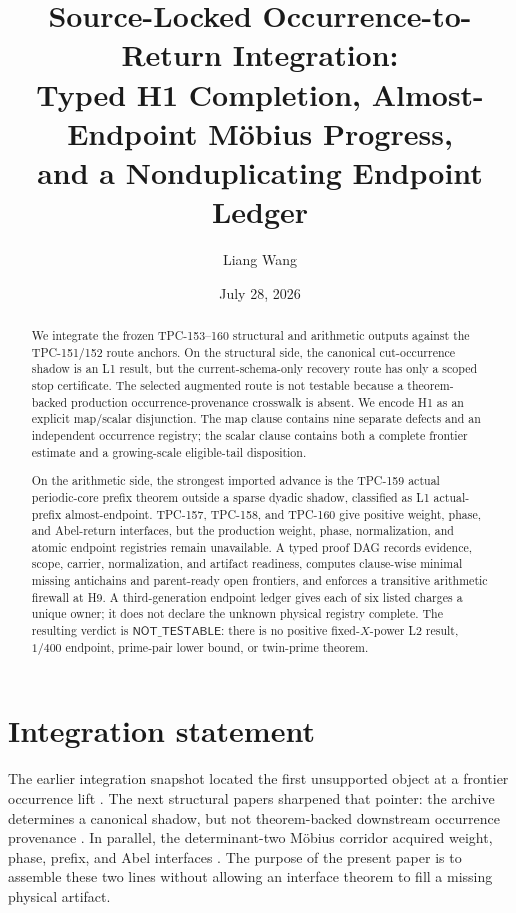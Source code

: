\documentclass[11pt]{article}
\title{\textbf{Source-Locked Occurrence-to-Return Integration:}\\
\textbf{Typed H1 Completion, Almost-Endpoint M\"obius Progress,}\\
\textbf{and a Nonduplicating Endpoint Ledger}}
\author{Liang Wang}
\date{July 28, 2026}
\theoremstyle{definition}
\begin{document}
\maketitle

\begin{abstract}
We integrate the frozen TPC-153--160 structural and arithmetic outputs
against the TPC-151/152 route anchors.  On the structural side, the
canonical cut-occurrence shadow is an L1 result, but the
current-schema-only recovery route has only a scoped stop certificate.
The selected augmented route is not testable because a theorem-backed
production occurrence-provenance crosswalk is absent.  We encode H1 as
an explicit map/scalar disjunction.  The map clause contains nine
separate defects and an independent occurrence registry; the scalar
clause contains both a complete frontier estimate and a growing-scale
eligible-tail disposition.

On the arithmetic side, the strongest imported advance is the TPC-159
actual periodic-core prefix theorem outside a sparse dyadic shadow,
classified as L1 actual-prefix almost-endpoint.  TPC-157, TPC-158, and
TPC-160 give positive weight, phase, and Abel-return interfaces, but
the production weight, phase, normalization, and atomic endpoint
registries remain unavailable.  A typed proof DAG records evidence,
scope, carrier, normalization, and artifact readiness, computes
clause-wise minimal missing antichains and parent-ready open
frontiers, and enforces a transitive arithmetic firewall at H9.  A
third-generation endpoint ledger gives each of six listed charges a
unique owner; it does not declare the unknown physical registry
complete.
The resulting verdict is \(\mathsf{NOT\_TESTABLE}\): there is no
positive fixed-\(X\)-power L2 result, \(1/400\) endpoint, prime-pair
lower bound, or twin-prime theorem.
\end{abstract}

\section{Integration statement}

The earlier integration snapshot located the first unsupported object
at a frontier occurrence lift \cite{WangTPC151,WangTPC152}.  The next
structural papers sharpened that pointer: the archive determines a
canonical shadow, but not theorem-backed downstream occurrence
provenance \cite{WangTPC153,WangTPC154,WangTPC155,WangTPC156}.  In
parallel, the determinant-two M\"obius corridor acquired weight,
phase, prefix, and Abel interfaces
\cite{WangTPC157,WangTPC158,WangTPC159,WangTPC160}.  The purpose of the
present paper is to assemble these two lines without allowing an
interface theorem to fill a missing physical artifact.
\end{document}
